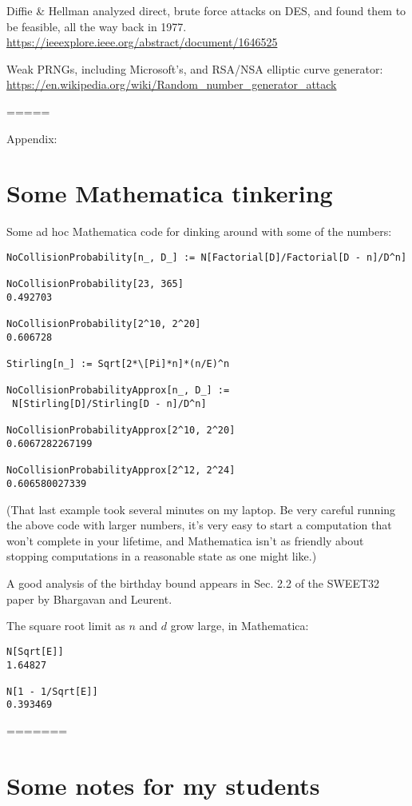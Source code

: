 \documentclass[%
 aip,
 jmp,%
 amsmath,amssymb,
 reprint,%
]{revtex4-1}
\begin{document}
Diffie \& Hellman analyzed direct, brute force attacks on DES, and
found them to be feasible, all the way back in 1977.
\url{https://ieeexplore.ieee.org/abstract/document/1646525}

Weak PRNGs, including Microsoft's, and RSA/NSA elliptic curve
generator:
\url{https://en.wikipedia.org/wiki/Random_number_generator_attack}

=====

\appendix
\onecolumngrid

Appendix:

\section{Some Mathematica tinkering}

Some ad hoc Mathematica code for dinking around with some of the
numbers:

\begin{verbatim}
NoCollisionProbability[n_, D_] := N[Factorial[D]/Factorial[D - n]/D^n]

NoCollisionProbability[23, 365]
0.492703

NoCollisionProbability[2^10, 2^20]
0.606728

Stirling[n_] := Sqrt[2*\[Pi]*n]*(n/E)^n

NoCollisionProbabilityApprox[n_, D_] := 
 N[Stirling[D]/Stirling[D - n]/D^n]

NoCollisionProbabilityApprox[2^10, 2^20]
0.6067282267199

NoCollisionProbabilityApprox[2^12, 2^24]
0.606580027339
\end{verbatim}
(That last example took several minutes on my laptop.  Be very careful
running the above code with larger numbers, it's very easy to start a
computation that won't complete in your lifetime, and Mathematica
isn't as friendly about stopping computations in a reasonable state as
one might like.)

A good analysis of the birthday bound appears in Sec. 2.2 of the
SWEET32 paper by Bhargavan and Leurent.

The square root limit as $n$ and $d$ grow large, in Mathematica:

\begin{verbatim}
N[Sqrt[E]]
1.64827

N[1 - 1/Sqrt[E]]
0.393469
\end{verbatim}

=======

\section{Some notes for my students}
\end{document}
